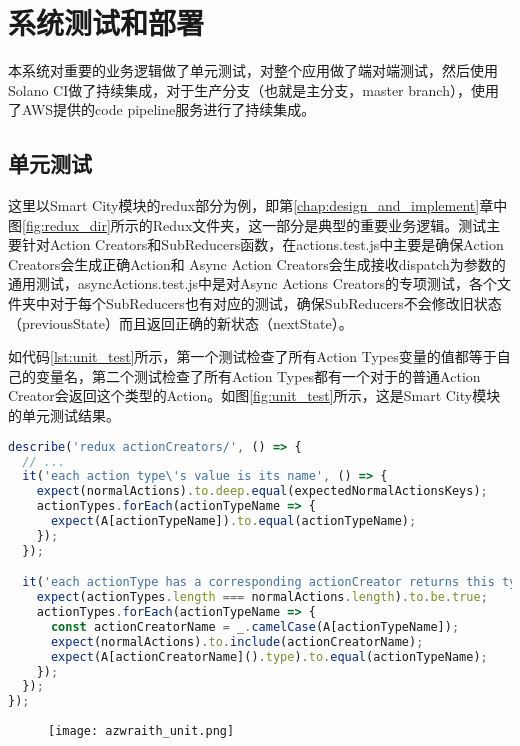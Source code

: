 
\chapter{系统测试和部署}
\label{chap:test_and_deploy}
本系统对重要的业务逻辑做了单元测试，对整个应用做了端对端测试，然后使用Solano CI做了持续集成，对于生产分支（也就是主分支，master branch），使用了AWS提供的code pipeline服务进行了持续集成。
\section{单元测试}
这里以Smart City模块的redux部分为例，即第\ref{chap:design_and_implement}章中图\ref{fig:redux_dir}所示的Redux文件夹，这一部分是典型的重要业务逻辑。测试主要针对Action Creators和SubReducers函数，在actions.test.js中主要是确保Action Creators会生成正确Action和 Async Action Creators会生成接收dispatch为参数的通用测试，asyncActions.test.js中是对Async Actions Creators的专项测试，各个文件夹中对于每个SubReducers也有对应的测试，确保SubReducers不会修改旧状态（previousState）而且返回正确的新状态（nextState）。

如代码\ref{lst:unit_test}所示，第一个测试检查了所有Action Types变量的值都等于自己的变量名，第二个测试检查了所有Action Types都有一个对于的普通Action Creator会返回这个类型的Action。如图\ref{fig:unit_test}所示，这是Smart City模块的单元测试结果。
\begin{lstlisting}[language={JavaScript}, label={lst:unit_test}, caption={单元测试样例代码}]
describe('redux actionCreators/', () => {
  // ...
  it('each action type\'s value is its name', () => {
    expect(normalActions).to.deep.equal(expectedNormalActionsKeys);
    actionTypes.forEach(actionTypeName => {
      expect(A[actionTypeName]).to.equal(actionTypeName);
    });
  });

  it('each actionType has a corresponding actionCreator returns this type of action', () => {
    expect(actionTypes.length === normalActions.length).to.be.true;
    actionTypes.forEach(actionTypeName => {
      const actionCreatorName = _.camelCase(A[actionTypeName]);
      expect(normalActions).to.include(actionCreatorName);
      expect(A[actionCreatorName]().type).to.equal(actionTypeName);
    });
  });
});
\end{lstlisting}

\begin{figure}[H]
 \centering
 \texttt{[image: azwraith\_unit.png]}
\end{figure}
